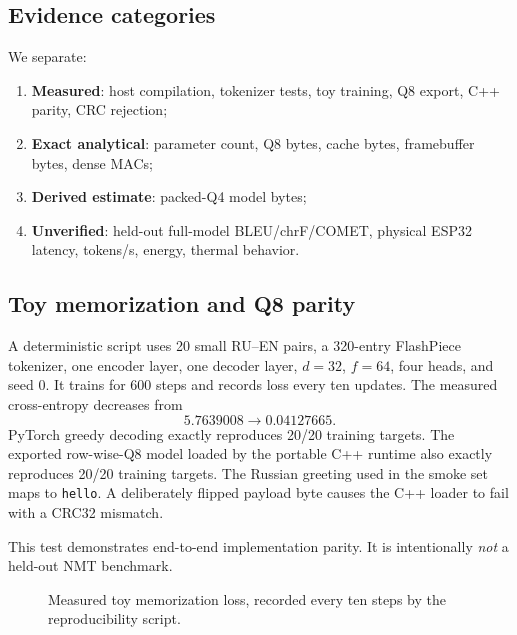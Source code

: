\documentclass{article}
\begin{document}
\subsection{Evidence categories}
We separate:
\begin{enumerate}[leftmargin=*]
\item \textbf{Measured}: host compilation, tokenizer tests, toy training, Q8 export, C++ parity, CRC rejection;
\item \textbf{Exact analytical}: parameter count, Q8 bytes, cache bytes, framebuffer bytes, dense MACs;
\item \textbf{Derived estimate}: packed-Q4 model bytes;
\item \textbf{Unverified}: held-out full-model BLEU/chrF/COMET, physical ESP32 latency, tokens/s, energy, thermal behavior.
\end{enumerate}

\subsection{Toy memorization and Q8 parity}
A deterministic script uses 20 small RU--EN pairs, a 320-entry FlashPiece tokenizer, one encoder layer, one decoder layer, $d=32$, $f=64$, four heads, and seed 0. It trains for 600 steps and records loss every ten updates. The measured cross-entropy decreases from
\begin{equation}
5.7639008\rightarrow0.04127665.
\end{equation}
PyTorch greedy decoding exactly reproduces 20/20 training targets. The exported row-wise-Q8 model loaded by the portable C++ runtime also exactly reproduces 20/20 training targets. The Russian greeting used in the smoke set maps to \texttt{hello}. A deliberately flipped payload byte causes the C++ loader to fail with a CRC32 mismatch.

This test demonstrates end-to-end implementation parity. It is intentionally \emph{not} a held-out NMT benchmark.

\begin{figure}[t]
\centering
{}
\caption{Measured toy memorization loss, recorded every ten steps by the reproducibility script.}
\end{figure}
\end{document}
